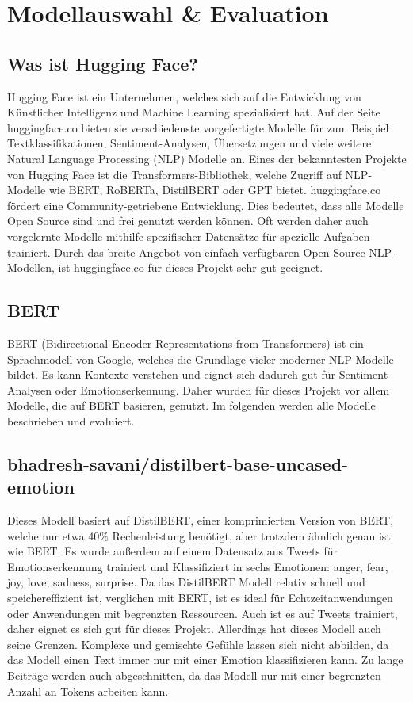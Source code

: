 \section{Modellauswahl \& Evaluation}

\subsection{Was ist Hugging Face?}
Hugging Face ist ein Unternehmen, welches sich auf die Entwicklung von Künstlicher Intelligenz und Machine Learning spezialisiert hat. Auf der Seite huggingface.co bieten sie verschiedenste vorgefertigte Modelle für zum Beispiel Textklassifikationen, Sentiment-Analysen, Übersetzungen und viele weitere Natural Language Processing (NLP) Modelle an. Eines der bekanntesten Projekte von Hugging Face ist die Transformers-Bibliothek, welche Zugriff auf NLP-Modelle wie BERT, RoBERTa, DistilBERT oder GPT bietet. huggingface.co fördert eine Community-getriebene Entwicklung. Dies bedeutet, dass alle Modelle Open Source sind und frei genutzt werden können. Oft werden daher auch vorgelernte Modelle mithilfe spezifischer Datensätze für spezielle Aufgaben trainiert. Durch das breite Angebot von einfach verfügbaren Open Source NLP-Modellen, ist huggingface.co für dieses Projekt sehr gut geeignet.

\subsection{BERT}
BERT (Bidirectional Encoder Representations from Transformers) ist ein Sprachmodell von Google, welches die Grundlage vieler moderner NLP-Modelle bildet. Es kann Kontexte verstehen und eignet sich dadurch gut für Sentiment-Analysen oder Emotionserkennung. Daher wurden für dieses Projekt vor allem Modelle, die auf BERT basieren, genutzt. Im folgenden werden alle Modelle beschrieben und evaluiert.

\subsection{bhadresh-savani/distilbert-base-uncased-emotion}
Dieses Modell basiert auf DistilBERT, einer komprimierten Version von BERT, welche nur etwa 40\% Rechenleistung benötigt, aber trotzdem ähnlich genau ist wie BERT. Es wurde außerdem auf einem Datensatz aus Tweets für Emotionserkennung trainiert und Klassifiziert in sechs Emotionen: anger, fear, joy, love, sadness, surprise. Da das DistilBERT Modell relativ schnell und speichereffizient ist, verglichen mit BERT, ist es ideal für Echtzeitanwendungen oder Anwendungen mit begrenzten Ressourcen. Auch ist es auf Tweets trainiert, daher eignet es sich gut für dieses Projekt. Allerdings hat dieses Modell auch seine Grenzen. Komplexe und gemischte Gefühle lassen sich nicht abbilden, da das Modell einen Text immer nur mit einer Emotion klassifizieren kann. Zu lange Beiträge werden auch abgeschnitten, da das Modell nur mit einer begrenzten Anzahl an Tokens arbeiten kann.

